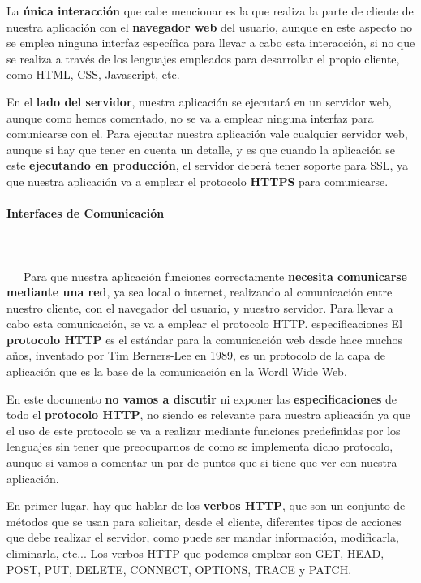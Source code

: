 La \textbf{única interacción} que cabe mencionar es la que realiza la parte de cliente de nuestra aplicación con el \textbf{navegador web} del usuario, aunque en este aspecto no se emplea ninguna interfaz específica para llevar a cabo esta interacción, si no que se realiza a través de los lenguajes empleados para desarrollar el propio cliente, como HTML, CSS, Javascript, etc.

En el \textbf{lado del servidor}, nuestra aplicación se ejecutará en un servidor web, aunque como hemos comentado, no se va a emplear ninguna interfaz para comunicarse con el. Para ejecutar nuestra aplicación vale cualquier servidor web, aunque si hay que tener en cuenta un detalle, y es que cuando la aplicación se este \textbf{ejecutando en producción}, el servidor deberá tener soporte para \gls{SSL}, ya que nuestra aplicación va a emplear el protocolo \textbf{HTTPS} para comunicarse.

\paragraph{Interfaces de Comunicación}
~\\\\
\-\ \-\ \-\ Para que nuestra aplicación funciones correctamente \textbf{necesita comunicarse mediante una red}, ya sea local o internet, realizando al comunicación entre nuestro cliente, con el navegador del usuario, y nuestro servidor. Para llevar a cabo esta comunicación, se va a emplear el protocolo \gls{HTTP}.
especificaciones
El \textbf{protocolo HTTP} es el estándar para la comunicación web desde hace muchos años, inventado por Tim Berners-Lee en 1989, es un protocolo de la capa de aplicación que es la base de la comunicación en la Wordl Wide Web. \cite{wiki01}

En este documento \textbf{no vamos a discutir} ni exponer las \textbf{especificaciones} de todo el \textbf{protocolo HTTP}, no siendo es relevante para nuestra aplicación ya que el uso de este protocolo se va a realizar mediante funciones predefinidas por los lenguajes sin tener que preocuparnos de como se implementa dicho protocolo, aunque si vamos a comentar un par de puntos que si tiene que ver con nuestra aplicación.

En primer lugar, hay que hablar de los \textbf{verbos HTTP}, que son un conjunto de métodos que se usan para solicitar, desde el cliente, diferentes tipos de acciones que debe realizar el servidor, como puede ser mandar información, modificarla, eliminarla, etc... Los verbos HTTP que podemos emplear son GET, HEAD, POST, PUT, DELETE, CONNECT, OPTIONS, TRACE y PATCH. \cite{mdn01}

